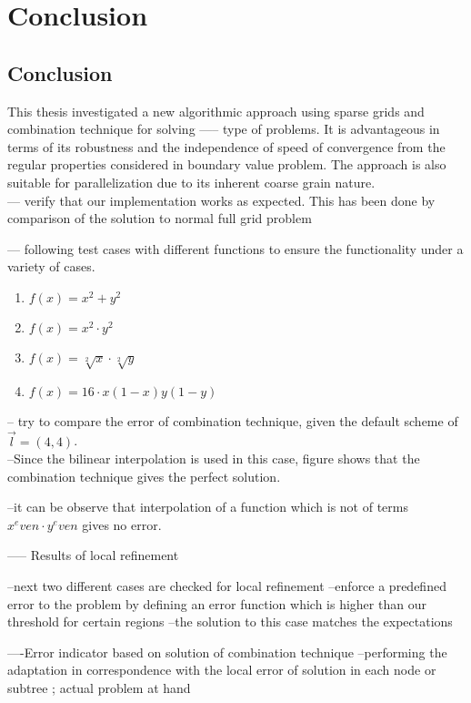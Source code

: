 \chapter{Conclusion}
\label{chapter:results}

\section{Conclusion}
This thesis investigated a new algorithmic approach using sparse grids and combination technique for solving ----- type of problems. It is advantageous in terms of its robustness and the independence of speed of convergence from the regular properties considered in boundary value problem. The approach is also suitable for parallelization due to its inherent coarse grain nature.\\

--- verify that our implementation works as expected. This has been done by comparison of the solution to normal full grid problem

--- following test cases with different functions
 to ensure the functionality under a variety of cases.
\begin{enumerate}
\item $f(x)=x^2+y^2$
\item $f(x)=x^2 \cdot y^2 $
\item $f(x)=\sqrt[2]{x} \cdot \sqrt[2]{y}$
\item $f(x)=16 \cdot x(1-x)y(1-y)$
\end{enumerate}

-- try to compare the error of combination technique, given the default scheme of $\overrightarrow{l}=(4,4)$.\\

--Since the bilinear interpolation is used in this case, figure shows that the combination technique gives the perfect solution.

--it can be observe that interpolation of a function which is not of terms $x^even \cdot y^even$ gives no error.

----- Results of local refinement

--next two different cases are checked for local refinement
--enforce a predefined error to the problem by defining an error function which is higher than our threshold for certain regions
--the solution to this case matches the expectations

----Error indicator based on solution of combination technique
--performing the adaptation in correspondence with the local error of solution in each node or subtree ; actual problem at hand


